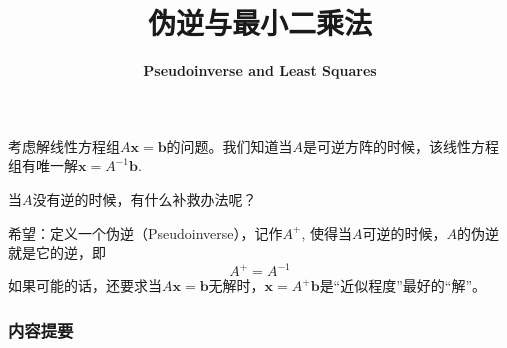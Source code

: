 



\title[Pseudoinverse and Least Squares]{\LARGE \bfseries 伪逆与最小二乘法} %
\author[] %
{\Large \bfseries Pseudoinverse and Least Squares}
\date{}






\begin{frame}

\titlepage %

\end{frame}


\begin{frame}

考虑解线性方程组$A\mathbf{x} = \mathbf{b}$的问题。我们知道当$A$是可逆方阵的时候，该线性方程组有唯一解$\mathbf{x} = A^{-1}\mathbf{b}$.

\vspace{1em}

当$A$没有逆的时候，有什么补救办法呢？

\vspace{1em}

希望：定义一个伪逆（Pseudoinverse），记作$A^+$, 使得当$A$可逆的时候，$A$的伪逆就是它的逆，即
$$A^+ = A^{-1}$$
如果可能的话，还要求当$A\mathbf{x} = \mathbf{b}$无解时，$\mathbf{x} = A^+\mathbf{b}$是``近似程度''最好的``解''。

\end{frame}


\begin{frame}
\frametitle{内容提要} %
\tableofcontents %
\end{frame}

